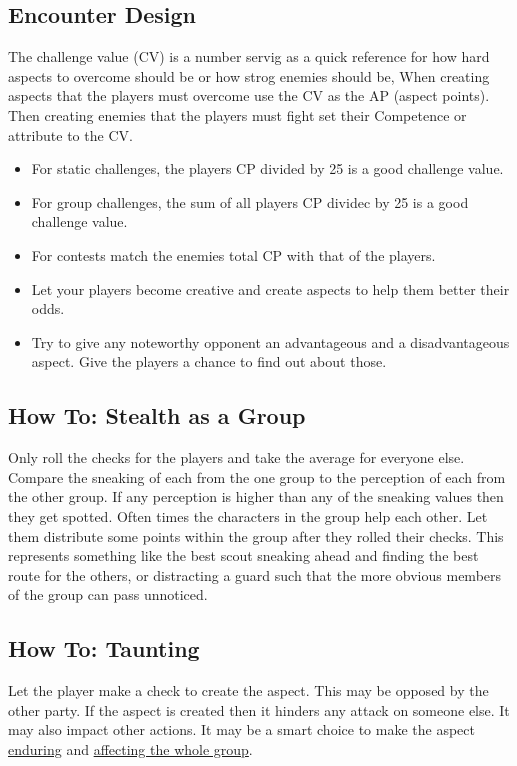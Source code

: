 \documentclass[11pt]{article}
\begin{document}
{\subsection{Encounter Design}
\label{sec:org7d2f5ea}

The challenge value (CV) is a number servig as a quick reference for how hard aspects to overcome should be or how strog enemies should be, When creating aspects that the players must overcome use the CV as the AP (aspect points). Then creating enemies that the players must fight set their Competence or attribute to the CV.
\begin{itemize}
\item For static challenges, the players CP divided by 25 is a good challenge value.
\item For group challenges, the sum of all players CP dividec by 25 is a good challenge value.
\item For contests match the enemies total CP with that of the players.
\item Let your players become creative and create aspects to help them better their odds.
\item Try to give any noteworthy opponent an advantageous and a disadvantageous aspect. Give the players a chance to find out about those.
\end{itemize}
\subsection{How To: Stealth as a Group}
\label{sec:org7fe10a1}

Only roll the checks for the players and take the average for everyone else. Compare the sneaking of each from the one group to the perception of each from the other group. If any perception is higher than any of the sneaking values then they get spotted.
Often times the characters in the group help each other. Let them distribute some points within the group after they rolled their checks. This represents something like the best scout sneaking ahead and finding the best route for the others, or distracting a guard such that the more obvious members of the group can pass unnoticed.
\subsection{How To: Taunting}
\label{sec:org998fdd3}
Let the player make a check to create the  aspect. This may be opposed by the other party. If the aspect is created then it hinders any attack on someone else. It may also impact other actions. It may be a smart choice to make the  aspect \hyperref[sec:orgafbb491]{enduring} and \hyperref[sec:orge5e0932]{affecting the whole group}. 
}
\end{document}
